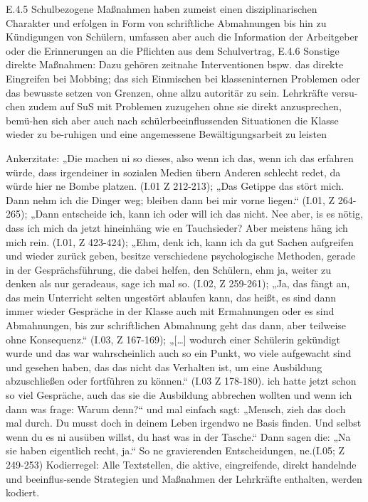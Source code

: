 E.4.5 Schulbezogene Maßnahmen haben zumeist einen disziplinarischen Charakter und erfolgen in Form von schriftliche Abmahnungen bis hin zu Kündigungen von Schülern, umfassen aber auch die Information der Arbeitgeber oder die Erinnerungen an die Pflichten aus dem Schulvertrag,  
E.4.6 Sonstige direkte Maßnahmen: Dazu gehören zeitnahe Interventionen bspw. das direkte Eingreifen bei Mobbing; das sich Einmischen bei klasseninternen Problemen oder das bewusste setzen von Grenzen, ohne allzu autoritär zu sein. Lehrkräfte versu-chen zudem auf SuS mit Problemen zuzugehen ohne sie direkt anzusprechen, bemü-hen sich aber auch nach schülerbeeinflussenden Situationen die Klasse wieder zu be-ruhigen und eine angemessene Bewältigungsarbeit zu leisten

Ankerzitate: „Die machen ni so dieses, also wenn ich das, wenn ich das erfahren würde, dass irgendeiner in sozialen Medien übern Anderen schlecht redet, da würde hier ne Bombe platzen. (I.01 Z 212-213);  „Das Getippe das stört mich. Dann nehm ich die Dinger weg; bleiben dann bei mir vorne liegen.“ (I.01, Z 264-265); „Dann entscheide ich, kann ich oder will ich das nicht. Nee aber, is es nötig, dass ich mich da jetzt hineinhäng wie en Tauchsieder? Aber meistens häng ich mich rein. (I.01, Z 423-424); „Ehm, denk ich, kann ich da gut Sachen aufgreifen und wieder zurück geben, besitze verschiedene psychologische Methoden, gerade in der Gesprächsführung, die dabei helfen, den Schülern, ehm ja, weiter zu denken als nur geradeaus, sage ich mal so. (I.02, Z 259-261); „Ja, das fängt an, das mein Unterricht selten ungestört ablaufen kann, das heißt, es sind dann immer wieder Gespräche in der Klasse auch mit Ermahnungen oder es sind Abmahnungen, bis zur schriftlichen Abmahnung geht das dann, aber teilweise ohne Konsequenz.“ (I.03, Z 167-169); „[…] wodurch einer Schülerin gekündigt wurde und das war wahrscheinlich auch so ein Punkt, wo viele aufgewacht sind und gesehen haben, das das nicht das Verhalten ist, um eine Ausbildung abzuschließen oder fortführen zu können.“ (I.03 Z 178-180). ich hatte jetzt schon so viel Gespräche, auch das sie die Ausbildung abbrechen wollten und wenn ich dann was frage: Warum denn?“ und mal einfach sagt: „Mensch, zieh das doch mal durch. Du musst doch in deinem Leben irgendwo ne Basis finden. Und selbst wenn  du es ni ausüben willst, du hast was in der Tasche.“ Dann sagen die: „Na sie haben eigentlich recht, ja.“ So ne gravierenden Entscheidungen, ne.(I.05; Z 249-253)
Kodierregel: Alle Textstellen, die aktive, eingreifende, direkt handelnde und beeinflus-sende Strategien und Maßnahmen der Lehrkräfte enthalten, werden kodiert. 
